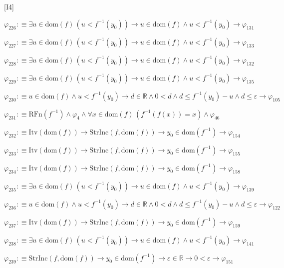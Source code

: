 \begin{fullproof}{[I4]}
\begin{abbrevlist}
\item $\varphi_{226} :\equiv \exists u \in \mathrm{dom}(f)\,(u < f^{-1}(y_{0})) \to u \in \mathrm{dom}(f) \land u < f^{-1}(y_{0}) \to \varphi_{131}$
\item $\varphi_{227} :\equiv \exists u \in \mathrm{dom}(f)\,(u < f^{-1}(y_{0})) \to u \in \mathrm{dom}(f) \land u < f^{-1}(y_{0}) \to \varphi_{133}$
\item $\varphi_{228} :\equiv \exists u \in \mathrm{dom}(f)\,(u < f^{-1}(y_{0})) \to u \in \mathrm{dom}(f) \land u < f^{-1}(y_{0}) \to \varphi_{132}$
\item $\varphi_{229} :\equiv \exists u \in \mathrm{dom}(f)\,(u < f^{-1}(y_{0})) \to u \in \mathrm{dom}(f) \land u < f^{-1}(y_{0}) \to \varphi_{135}$
\item $\varphi_{230} :\equiv u \in \mathrm{dom}(f) \land u < f^{-1}(y_{0}) \to d \in \mathbb{R} \land 0 < d \land d \leq f^{-1}(y_{0}) - u \land d \leq \varepsilon \to \varphi_{105}$
\item $\varphi_{231} :\equiv \mathrm{RFn}(f^{-1}) \land \varphi_{4} \land \forall x \in \mathrm{dom}(f)\,(f^{-1}(f(x)) = x) \land \varphi_{46}$
\item $\varphi_{232} :\equiv \mathrm{Itv}(\mathrm{dom}(f)) \to \mathrm{StrInc}(f,\mathrm{dom}(f)) \to y_{0} \in \mathrm{dom}(f^{-1}) \to \varphi_{154}$
\item $\varphi_{233} :\equiv \mathrm{Itv}(\mathrm{dom}(f)) \to \mathrm{StrInc}(f,\mathrm{dom}(f)) \to y_{0} \in \mathrm{dom}(f^{-1}) \to \varphi_{155}$
\item $\varphi_{234} :\equiv \mathrm{Itv}(\mathrm{dom}(f)) \to \mathrm{StrInc}(f,\mathrm{dom}(f)) \to y_{0} \in \mathrm{dom}(f^{-1}) \to \varphi_{158}$
\item $\varphi_{235} :\equiv \exists u \in \mathrm{dom}(f)\,(u < f^{-1}(y_{0})) \to u \in \mathrm{dom}(f) \land u < f^{-1}(y_{0}) \to \varphi_{139}$
\item $\varphi_{236} :\equiv u \in \mathrm{dom}(f) \land u < f^{-1}(y_{0}) \to d \in \mathbb{R} \land 0 < d \land d \leq f^{-1}(y_{0}) - u \land d \leq \varepsilon \to \varphi_{122}$
\item $\varphi_{237} :\equiv \mathrm{Itv}(\mathrm{dom}(f)) \to \mathrm{StrInc}(f,\mathrm{dom}(f)) \to y_{0} \in \mathrm{dom}(f^{-1}) \to \varphi_{159}$
\item $\varphi_{238} :\equiv \exists u \in \mathrm{dom}(f)\,(u < f^{-1}(y_{0})) \to u \in \mathrm{dom}(f) \land u < f^{-1}(y_{0}) \to \varphi_{141}$
\item $\varphi_{239} :\equiv \mathrm{StrInc}(f,\mathrm{dom}(f)) \to y_{0} \in \mathrm{dom}(f^{-1}) \to \varepsilon \in \mathbb{R} \to 0 < \varepsilon \to \varphi_{151}$

\end{abbrevlist}
\end{fullproof}
